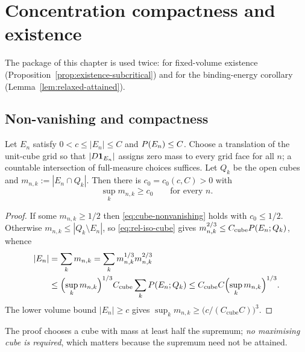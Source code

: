 \chapter{Concentration compactness and existence}\label{ch:existence}

The package of this chapter is used twice: for fixed-volume existence
(Proposition~\ref{prop:existence-subcritical}) and for the binding-energy
corollary (Lemma~\ref{lem:relaxed-attained}).

\section{Non-vanishing and compactness}

\begin{lemma}\label{lem:cube-nonvanishing}
Let $E_n$ satisfy $0<c\le|E_n|\le C$ and $P(E_n)\le C$.  Choose a
translation of the unit-cube grid so that $|D\mathbf 1_{E_n}|$ assigns zero mass to
every grid face for all $n$; a countable intersection of full-measure choices
suffices.  Let $Q_k$ be the open cubes and $m_{n,k}:=|E_n\cap Q_k|$.  Then
there is $c_0=c_0(c,C)>0$ with
\begin{equation}\label{eq:cube-nonvanishing}
  \sup_km_{n,k}\ge c_0\qquad\text{for every }n .
\end{equation}
\end{lemma}

\begin{proof}
If some $m_{n,k}\ge1/2$ then \eqref{eq:cube-nonvanishing} holds with
$c_0\le1/2$.  Otherwise
$m_{n,k}\le|Q_k\setminus E_n|$, so \eqref{eq:rel-iso-cube} gives
$m_{n,k}^{2/3}\le C_{\mathrm{cube}}P(E_n;Q_k)$, whence
\[
\begin{aligned}
  |E_n|&=\sum_km_{n,k}=\sum_km_{n,k}^{1/3}m_{n,k}^{2/3}\\
  &\le\Bigl(\sup_km_{n,k}\Bigr)^{1/3}
     C_{\mathrm{cube}}\sum_kP(E_n;Q_k)
  \le C_{\mathrm{cube}}C\Bigl(\sup_km_{n,k}\Bigr)^{1/3}.
\end{aligned}
\]
The lower volume bound $|E_n|\ge c$ gives
$\sup_km_{n,k}\ge\bigl(c/(C_{\mathrm{cube}}C)\bigr)^3$.
\end{proof}

\begin{fnote}\label{fnote:no-maximizing-cube}
The proof chooses a cube with mass at least half the supremum; \emph{no
maximising cube is required}, which matters because the supremum need not be
attained.
\end{fnote}

